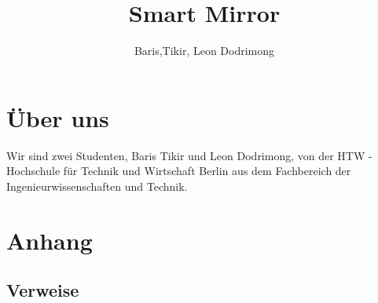 \documentclass[a4paper,11pt]{article}
\author{Baris,Tikir, Leon Dodrimong}
\title{Smart Mirror}
\begin{document}
\maketitle
\newpage
\tableofcontents
\newpage











\section{Über uns}
Wir sind zwei Studenten, Baris Tikir und Leon Dodrimong, von der HTW - Hochschule für
Technik und Wirtschaft Berlin aus dem Fachbereich der Ingenieurwissenschaften und
Technik. 


\section{Anhang}
\subsection{Verweise}
\end{document}
